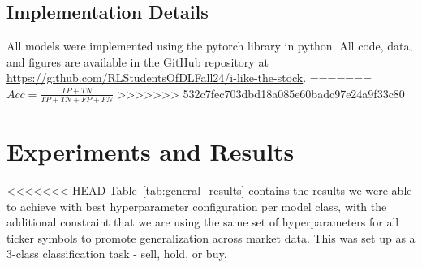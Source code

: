\documentclass[10pt,twocolumn,letterpaper]{article}
\begin{document}
\subsection{Implementation Details}

All models were implemented using the pytorch library in python\cite{paszke2017automatic}. All code, data, and figures are available in the GitHub repository at \url{https://github.com/RLStudentsOfDLFall24/i-like-the-stock}.
=======
$Acc = \frac{TP + TN}{TP + TN + FP + FN}$
>>>>>>> 532c7fec703dbd18a085e60badc97e24a9f33c80


\section{Experiments and Results}

<<<<<<< HEAD
Table~\ref{tab:general_results} contains the results we were able to achieve with best hyperparameter configuration per model class, with the additional constraint that we are using the same set of hyperparameters for all ticker symbols to promote generalization across market data. This was set up as a 3-class classification task - sell, hold, or buy.

\begin{table}
\begin{center}
\end{center}
\caption{Data splits and time frames.}
\label{tab:general_results}
\end{table}
\end{document}
